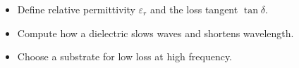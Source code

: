 \begin{objectives}
\begin{itemize}[leftmargin=1.4em,itemsep=2pt]
\item Define relative permittivity $\varepsilon_r$ and the loss tangent $\tan\delta$.
\item Compute how a dielectric slows waves and shortens wavelength.
\item Choose a substrate for low loss at high frequency.
\end{itemize}
\end{objectives}

